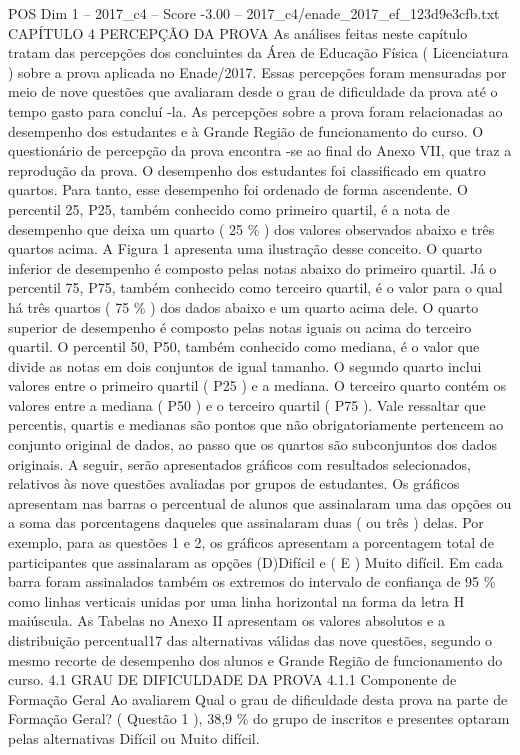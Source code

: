 \begin{textsample}{POS Dim 1 – 2017\_c4 – Score -3.00 – 2017\_c4/enade\_2017\_ef\_123d9e3cfb.txt}  \label{ex:f1_pos_280}
CAPÍTULO 4 PERCEPÇÃO DA PROVA As análises feitas neste capítulo tratam das percepções dos concluintes da Área de Educação Física ( Licenciatura ) sobre a prova aplicada no Enade/2017.
Essas percepções foram mensuradas por meio de nove questões que avaliaram desde o grau de dificuldade da prova até o tempo gasto para concluí -la.
As percepções sobre a prova foram relacionadas ao desempenho dos estudantes e à Grande Região de funcionamento do curso.
O questionário de percepção da prova encontra -se ao final do Anexo VII, que traz a reprodução da prova.
O desempenho dos estudantes foi classificado em quatro quartos.
Para tanto, esse desempenho foi ordenado de forma ascendente.
O percentil 25, P25, também conhecido como primeiro quartil, é a nota de desempenho que deixa um quarto ( 25 \% ) dos valores observados abaixo e três quartos acima.
A Figura 1 apresenta uma ilustração desse conceito.
O quarto inferior de desempenho é composto pelas notas abaixo do primeiro quartil.
Já o percentil 75, P75, também conhecido como terceiro quartil, é o valor para o qual há três quartos ( 75 \% ) dos dados abaixo e um quarto acima dele.
O quarto superior de desempenho é composto pelas notas iguais ou acima do terceiro quartil.
O percentil 50, P50, também conhecido como mediana, é o valor que divide as notas em dois conjuntos de igual tamanho.
O segundo quarto inclui valores entre o primeiro quartil ( P25 ) e a mediana.
O terceiro quarto contém os valores entre a mediana ( P50 ) e o terceiro quartil ( P75 ).
Vale ressaltar que percentis, quartis e medianas são pontos que não obrigatoriamente pertencem ao conjunto original de dados, ao passo que os quartos são subconjuntos dos dados originais.
A seguir, serão apresentados gráficos com resultados selecionados, relativos às nove questões avaliadas por grupos de estudantes.
Os gráficos apresentam nas barras o percentual de alunos que assinalaram uma das opções ou a soma das porcentagens daqueles que assinalaram duas ( ou três ) delas.
Por exemplo, para as questões 1 e 2, os gráficos apresentam a porcentagem total de participantes que assinalaram as opções (D)Difícil e ( E ) Muito difícil.
Em cada barra foram assinalados também os extremos do intervalo de confiança de 95 \% como linhas verticais unidas por uma linha horizontal na forma da letra H maiúscula.
As Tabelas no Anexo II apresentam os valores absolutos e a distribuição percentual17 das alternativas válidas das nove questões, segundo o mesmo recorte de desempenho dos alunos e Grande Região de funcionamento do curso. 4.1 GRAU DE DIFICULDADE DA PROVA 4.1.1 Componente de Formação Geral Ao avaliarem Qual o grau de dificuldade desta prova na parte de Formação Geral? ( Questão 1 ), 38,9 \% do grupo de inscritos e presentes optaram pelas alternativas Difícil ou Muito difícil.

\end{textsample}
